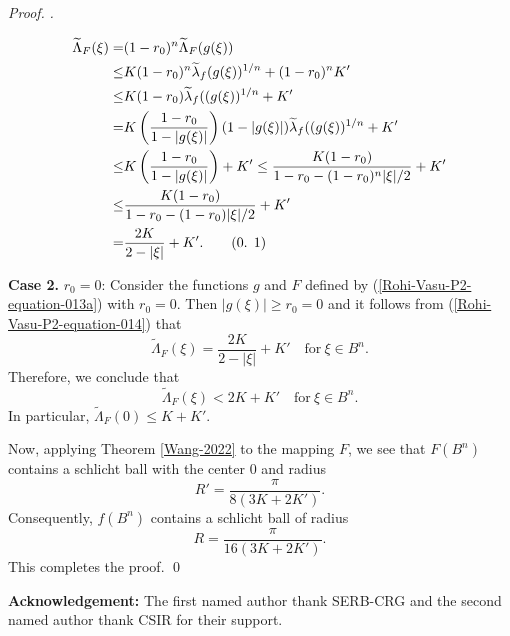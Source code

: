 \documentclass[a4paper,12pt,reqno]{amsart}
\theoremstyle{plain}
\newcommand\numberthis{\addtocounter{equation}{1}\tag{\theequation}}
\theoremstyle{definition}
\newenvironment{pf}[1][]{%
	\vskip 3mm
	\noindent
	\ifthenelse{\equal{#1}{}}%
	{{\slshape Proof. }}%
	{{\slshape #1.} }%
}%
{\qed\bigskip}
\renewcommand{\theequation}{\thesection.
\arabic{equation}}
\numberwithin{equation}{section}
\begin{document}
\begin{pf}
\begin{align*}{\label{Rohi-Vasu-P2-equation-014}}
\widetilde{\Lambda}_F(\xi)= & (1-r_0)^n \widetilde{\Lambda}_F(g(\xi)) \\
\leq &  K(1-r_0)^n\widetilde{\lambda}_f(g(\xi))^{1/n}+(1-r_0)^nK'\\
\leq & K(1-r_0)\widetilde{\lambda}_f((g(\xi))^{1/n}+K'\\
= & K\left(\frac{1-r_0}{1-|g(\xi)|}\right)(1-|g(\xi)|)\widetilde{\lambda}_f((g(\xi))^{1/n}+K'\\ \vspace{2mm}
\leq & K\left(\frac{1-r_0}{1-|g(\xi)|}\right)+K'\leq \frac{K(1-r_0)}{1-r_0-(1-r_0)^n|\xi|/2}+K'\\ \vspace{2mm}
\leq & \frac{K(1-r_0)}{1-r_0-(1-r_0)|\xi|/2}+K'\\
= & \frac{2K}{2-|\xi|}+K'. \numberthis
\end{align*}

\textbf{Case 2.} $r_0=0$: Consider the functions $g$ and $F$ defined by (\ref{Rohi-Vasu-P2-equation-013a}) with $r_0=0$. Then $|g(\xi)|\geq r_0=0$ and it follows from (\ref{Rohi-Vasu-P2-equation-014}) that
 $$
 \widetilde{\Lambda}_F(\xi) = \frac{2K}{2-|\xi|}+K' \quad \text{for}\ \xi\in B^n.
 $$
 Therefore, we conclude that
 $$
\widetilde{\Lambda}_F(\xi) < 2K+K' \quad \text{for}\ \xi\in B^n.
 $$
 In particular, $\widetilde{\Lambda}_F(0)\leq K+K'.$
 \vspace{2mm}
 
 Now, applying Theorem \ref{Wang-2022} to the mapping $F$, we see that $F(B^n)$ contains a schlicht ball with the center $0$ and radius
       $$R'=\frac{\pi}{8(3K+2K')}.$$
Consequently, $f(B^n)$ contains a schlicht ball of radius 
$$R=\frac{\pi}{16(3K+2K')}.$$
This completes the proof.
\end{pf}

\noindent\textbf{Acknowledgement:}  The first named author thank SERB-CRG and the second named author thank CSIR for their support. 
\end{document}

